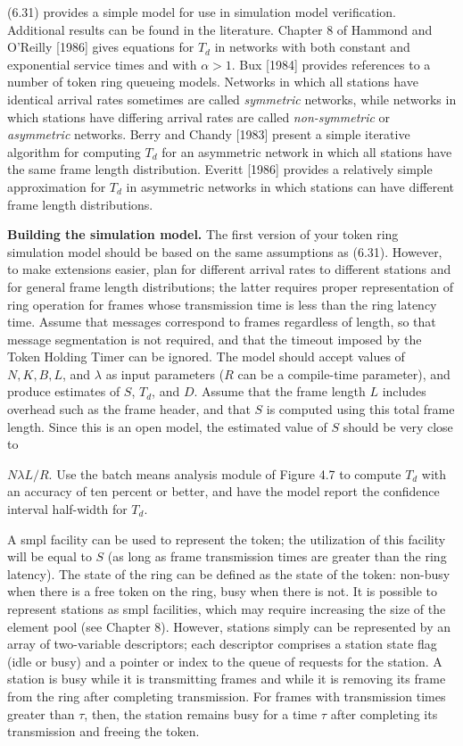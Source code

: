 (6.31) provides a simple model for use in simulation model verification. Additional results can be found in the literature. Chapter 8 of Hammond and O'Reilly [1986] gives equations for $T_d$ in networks with both constant and exponential service times and with $\alpha>1$. Bux [1984] provides references to a number of token ring queueing models. Networks in which all stations have identical arrival rates sometimes are called \emph{symmetric} networks, while networks in which stations have differing arrival rates are called \emph{non-symmetric} or \emph{asymmetric} networks. Berry and Chandy [1983] present a simple iterative algorithm for computing $T_d$ for an asymmetric network in which all stations have the same frame length distribution. Everitt [1986] provides a relatively simple approximation for $T_d$ in asymmetric networks in which stations can have different frame length distributions.

\noindent\textbf{Building the simulation model.} The first version of your token ring simulation model should be based on the same assumptions as (6.31). However, to make extensions easier, plan for different arrival rates to different stations and for general frame length distributions; the latter requires proper representation of ring operation for frames whose transmission time is less than the ring latency time. Assume that messages correspond to frames regardless of length, so that message segmentation is not required, and that the timeout imposed by the Token Holding Timer can be ignored. The model should accept values of $N,K,B,L$, and $\lambda$ as input parameters ($R$ can be a compile-time parameter), and produce estimates of $S$, $T_d$, and $D$. Assume that the frame length $L$ includes overhead such as the frame header, and that $S$ is computed using this total frame length. Since this is an open model, the estimated value of $S$ should be very close to

\noindent $N\lambda L/R$. Use the batch means analysis module of Figure 4.7 to compute $T_d$ with an accuracy of ten percent or better, and have the model report the confidence interval half-width for $T_d$.

A smpl facility can be used to represent the token; the utilization of this facility will be equal to $S$ (as long as frame transmission times are greater than the ring latency). The state of the ring can be defined as the state of the token: non-busy when there is a free token on the ring, busy when there is not. It is possible to represent stations as smpl facilities, which may require increasing the size of the element pool (see Chapter 8). However, stations simply can be represented by an array of two-variable descriptors; each descriptor comprises a station state flag (idle or busy) and a pointer or index to the queue of requests for the station. A station is busy while it is transmitting frames and while it is removing its frame from the ring after completing transmission. For frames with transmission times greater than $\tau$, then, the station remains busy for a time $\tau$ after completing its transmission and freeing the token.

